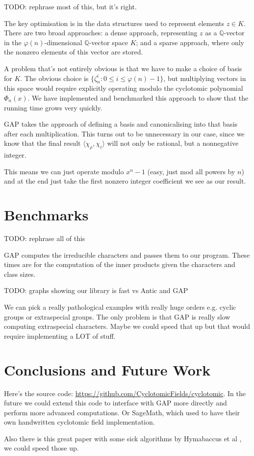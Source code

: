 \documentclass{article}
\begin{document}
TODO: rephrase most of this, but it's right.

The key optimisation is in the data structures used to represent
elements $z \in K$. There are two broad approaches: a dense approach,
representing $z$ as a $\mathbb{Q}$-vector in the
$\varphi(n)$-dimensional $\mathbb{Q}$-vector space $K$; and a sparse
approach, where only the nonzero elements of this vector are stored.

A problem that's not entirely obvious is that we have to make a choice
of basis for $K$. The obvious choice is $\{ \zeta_n^i : 0 \leq i \leq
\varphi(n)-1 \}$, but multiplying vectors in this space would require
explicitly operating modulo the cyclotomic polynomial $\Phi_n(x)$. We
have implemented and benchmarked this approach to show that the
running time grows very quickly.

GAP takes the approach of defining a basis and canonicalising into
that basis after each multiplication. This turns out to be unnecessary
in our case, since we know that the final result
$\langle \chi_\rho, \chi_i \rangle$ will not only be rational, but a
nonnegative integer.

This means we can just operate modulo $x^n-1$ (easy, just mod all
powers by $n$) and at the end just take the first nonzero integer
coefficient we see as our result.

\section{Benchmarks}

TODO: rephrase all of this

GAP computes the irreducible characters and passes them to our
program. These times are for the computation of the inner products
given the characters and class sizes.

TODO: graphs showing our library is fast vs Antic and GAP

We can pick a really pathological examples with really huge orders
e.g. cyclic groups or extraspecial groups. The only problem is that
GAP is really slow computing extraspecial characters. Maybe we could
speed that up but that would require implementing a LOT of stuff.

\section{Conclusions and Future Work}

Here's the source code:
\url{https://github.com/CyclotomicFields/cyclotomic}. In the future we
could extend this code to interface with GAP more directly and
perform more advanced computations. Or SageMath, which used to have
their own handwritten cyclotomic field implementation.

Also there is this great paper with some sick algorithms by Hymabaccus
et al \cite{Hymabaccus2020}, we could speed those up.



\end{document}
